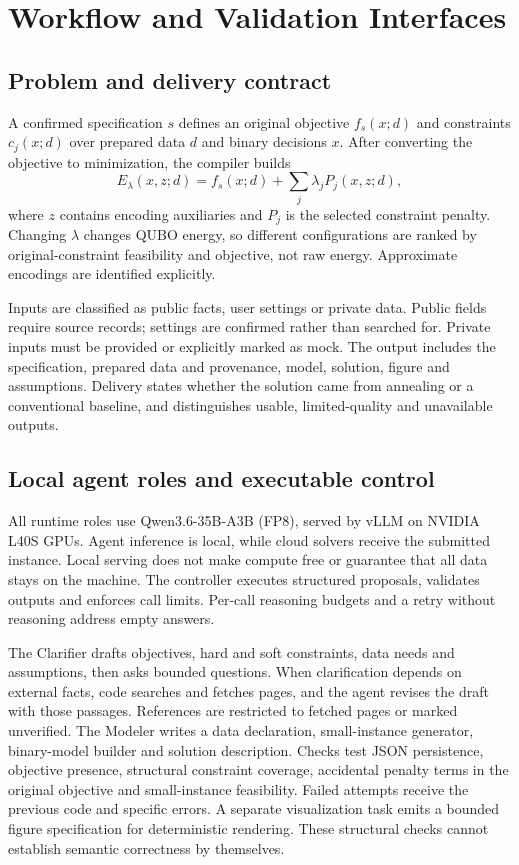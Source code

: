 \section{Workflow and Validation Interfaces}
\label{sec:system}
\subsection{Problem and delivery contract}
A confirmed specification $s$ defines an original objective $f_s(x;d)$ and constraints $c_j(x;d)$ over prepared
data $d$ and binary decisions $x$. After converting the objective to minimization, the compiler builds
\begin{equation}
 E_{\lambda}(x,z;d)=f_s(x;d)+\sum_j\lambda_j P_j(x,z;d),
\end{equation}
where $z$ contains encoding auxiliaries and $P_j$ is the selected constraint penalty. Changing $\lambda$ changes
QUBO energy, so different configurations are ranked by original-constraint feasibility and objective, not raw
energy. Approximate encodings are identified explicitly.

Inputs are classified as public facts, user settings or private data. Public fields require source records;
settings are confirmed rather than searched for. Private inputs must be provided or explicitly marked as mock.
The output includes the specification, prepared data and provenance, model, solution, figure and assumptions.
Delivery states whether the solution came from annealing or a conventional baseline, and distinguishes usable,
limited-quality and unavailable outputs.



\subsection{Local agent roles and executable control}
All runtime roles use Qwen3.6-35B-A3B (FP8), served by vLLM\cite{kwon2023vllm} on NVIDIA L40S GPUs. Agent
inference is local, while cloud solvers receive the submitted instance. Local serving does not make compute
free or guarantee that all data stays on the machine. The controller executes structured proposals, validates
outputs and enforces call limits. Per-call reasoning budgets and a retry without reasoning address empty answers.

The Clarifier drafts objectives, hard and soft constraints, data needs and assumptions, then asks bounded
questions. When clarification depends on external facts, code searches and fetches pages, and the agent revises
the draft with those passages. References are restricted to fetched pages or marked unverified.
The Modeler writes a data declaration, small-instance generator, binary-model builder and solution description.
Checks test JSON persistence, objective presence, structural constraint coverage, accidental penalty terms in
the original objective and small-instance feasibility. Failed attempts receive the previous code and specific
errors. A separate visualization task emits a bounded figure specification for deterministic rendering.
These structural checks cannot establish semantic correctness by themselves.


